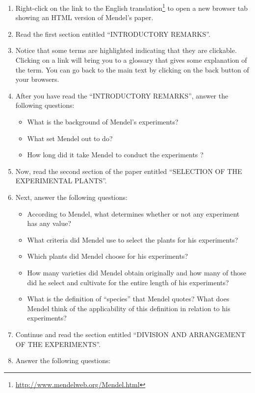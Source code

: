 \documentclass[]{book}
\providecommand{\tightlist}{%
  \setlength{\itemsep}{0pt}\setlength{\parskip}{0pt}}
\let\rmarkdownfootnote\footnote%
\def\footnote{\protect\rmarkdownfootnote}
\renewcommand{\href}[2]{#2\footnote{\url{#1}}}
\begin{document}
\begin{enumerate}
\def\labelenumi{\arabic{enumi}.}
\tightlist
\item
  Right-click on the link to the
  \href{http://www.mendelweb.org/Mendel.html}{English translation} to
  open a new browser tab showing an HTML version of Mendel's paper.
\item
  Read the first section entitled ``INTRODUCTORY REMARKS''.
\item
  Notice that some terms are highlighted indicating that they are
  clickable. Clicking on a link will bring you to a glossary that gives
  some explanation of the term. You can go back to the main text by
  clicking on the back button of your browsers.
\item
  After you have read the ``INTRODUCTORY REMARKS'', answer the following
  questions:

  \begin{itemize}
  \tightlist
  \item
    What is the background of Mendel's experiments?
  \item
    What set Mendel out to do?
  \item
    How long did it take Mendel to conduct the experiments ?
  \end{itemize}
\item
  Now, read the second section of the paper entitled ``SELECTION OF THE
  EXPERIMENTAL PLANTS''.
\item
  Next, answer the following questions:

  \begin{itemize}
  \tightlist
  \item
    According to Mendel, what determines whether or not any experiment
    has any value?
  \item
    What criteria did Mendel use to select the plants for his
    experiments?
  \item
    Which plants did Mendel choose for his experiments?
  \item
    How many varieties did Mendel obtain originally and how many of
    those did he select and cultivate for the entire length of his
    experiments?
  \item
    What is the definition of ``species'' that Mendel quotes? What does
    Mendel think of the applicability of this definition in relation to
    his experiments?
  \end{itemize}
\item
  Continue and read the section entitled ``DIVISION AND ARRANGEMENT OF
  THE EXPERIMENTS''.
\item
  Answer the following questions:


\end{enumerate}
\end{document}
